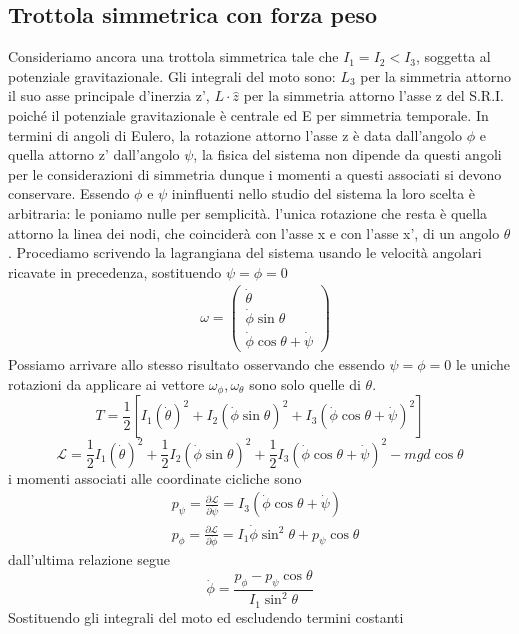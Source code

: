 \documentclass[
10pt, %
a4paper, %
oneside, %
headinclude,footinclude, %
BCOR5mm, %
]{scrartcl}
\begin{document}
\subsection{Trottola simmetrica con forza peso}
Consideriamo ancora una trottola simmetrica tale che \(I_1=I_2<I_3\), soggetta al potenziale gravitazionale. Gli integrali del moto sono: \(L_3\) per la simmetria attorno il suo asse principale d'inerzia z', \(L\cdot \hat{z}\) per la simmetria attorno l'asse z del S.R.I. poiché il potenziale gravitazionale è centrale ed E per simmetria temporale. In termini di angoli di Eulero, la rotazione attorno l'asse z è data dall'angolo $\phi$ e quella attorno z' dall'angolo $\psi$, la fisica del sistema non dipende da questi angoli per le considerazioni di simmetria dunque i momenti a questi associati si devono conservare. Essendo $\phi$ e $\psi$ ininfluenti nello studio del sistema la loro scelta è arbitraria: le poniamo nulle per semplicità. l'unica rotazione che resta è quella attorno la linea dei nodi, che coinciderà con l'asse x e con l'asse x', di un angolo \(\theta\). Procediamo scrivendo la lagrangiana del sistema usando le velocità angolari ricavate in precedenza, sostituendo \(\psi = \phi= 0\)
\begin{align*}
	&\omega = 
	\begin{pmatrix}
		\dot{\theta}\\
		\dot{\phi}\sin\theta\\
		\dot{\phi}\cos\theta+\dot{\psi}
	\end{pmatrix}
\end{align*}
Possiamo arrivare allo stesso risultato osservando che essendo \(\psi = \phi= 0\) le uniche rotazioni da applicare ai vettore \(\omega_\phi, \omega_\theta\) sono solo quelle di $\theta$.
\[T = \frac{1}{2}\left[I_1(\dot{\theta})^2+
I_2(\dot{\phi}\sin\theta)^2+
I_3(\dot{\phi}\cos\theta+\dot{\psi})^2\right]\]
\[\mathcal{L} = \frac{1}{2}I_1(\dot{\theta})^2+
\frac{1}{2}I_2(\dot{\phi}\sin\theta)^2+\frac{1}{2}
I_3(\dot{\phi}\cos\theta+\dot{\psi})^2-mgd\cos\theta\]
i momenti associati alle coordinate cicliche sono
\begin{align*}
	&p_\psi = \frac{\partial\mathcal{L}}{\partial \dot{\psi}} = I_3(\dot{\phi}\cos\theta+\dot{\psi})\\
	&p_\phi = \frac{\partial\mathcal{L}}{\partial \dot{\phi}} = I_1\dot{\phi}\sin^2\theta+p_\psi\cos\theta
\end{align*}
dall'ultima relazione segue
\[\dot{\phi} = \frac{p_\phi-p_\psi\cos\theta}{I_1\sin^2\theta}\]
Sostituendo gli integrali del moto ed escludendo termini costanti
\end{document}
